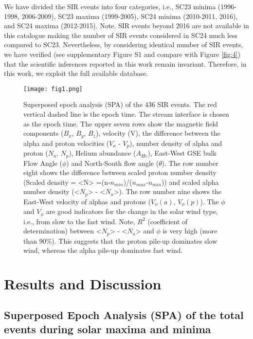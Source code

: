 \documentclass[letters,usenatbib]{mnras}
\begin{document}
We have divided the SIR events into four categories, i.e., SC23 minima (1996-1998, 2006-2009), SC23 maxima (1999-2005), SC24 minima (2010-2011, 2016), and SC24 maxima (2012-2015). Note, SIR events beyond 2016 are not available in this catalogue making the number of SIR events considered in SC24 much less compared to SC23. Nevertheless, by considering identical number of SIR events, we have verified (see supplementary Figure S1 and compare with Figure \ref{fig:4}) that the scientific inferences reported in this work remain invariant. Therefore, in this work, we exploit the full available database.   

\begin{figure}
\begin{center}
\texttt{[image: fig1.png]}
\caption{Superposed epoch analysis (SPA) of the 436 SIR events. The red vertical dashed line  is the epoch time. The stream interface is chosen as the epoch time. The upper seven rows show the magnetic field components ($B_x$, $B_y$, $B_z$), velocity (V), the difference between the alpha and proton velocities ($V_a$ - $V_p$), number density of alpha and proton ($N_a$, $N_p$), Helium abundance ($A_{He}$), East-West GSE bulk Flow Angle ($\phi$) and North-South flow angle ($\theta$). The  row number eight shows the difference between scaled  proton number density (Scaled density = <N> =(n-$n_{min}$)/($n_{max}$-$n_{min}$)) and scaled alpha number density (<$N_p$> - <$N_a$>). The   row number nine shows the East-West velocity of alphas and protons ($V_{\phi}(a)$, $V_{\phi}(p)$). The $\phi$ and $V_{\phi}$ are good indicators for the change in the solar wind type, i.e., from slow to the fast wind. Note, $R^2$ (coefficient of determination) between <$N_p$> - <$N_a$> and ${\phi}$ is very high (more than 90\%). This suggests that the proton pile-up dominates slow wind, whereas the alpha pile-up dominates fast wind.       \label{fig:1}}

\end{center}
\end{figure}
 	
\section{Results and Discussion }
\subsection{Superposed Epoch Analysis (SPA) of the total events during solar maxima and minima }
\end{document}
